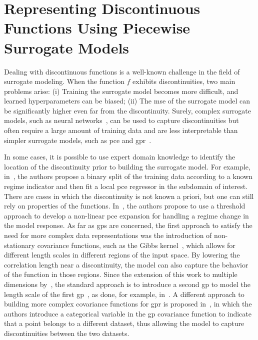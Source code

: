 
\section{Representing Discontinuous Functions Using Piecewise Surrogate Models}
\label{sec:discontinuous_functions}

Dealing with discontinuous functions is a well-known challenge in the field of surrogate modeling. When the function $f$ exhibits discontinuities, two main problems arise: (i) Training the surrogate model becomes more difficult, and learned hyperparameters can be biased; (ii) The \gls{mse} of the surrogate model can be significantly higher even far from the discontinuity. Surely, complex surrogate models, such as neural networks~\cite{ziatdinov2024activelearningfullybayesian}, can be used to capture discontinuities but often require a large amount of training data and are less interpretable than simpler surrogate models, such as \gls{pce} and \gls{gpr}~\cite{Palar2024}.

\smallskip
In some cases, it is possible to use expert domain knowledge to identify the location of the discontinuity prior to building the surrogate model. For example, in~\cite{GoriGallia2024}, the authors propose a binary split of the training data according to a known regime indicator and then fit a local \gls{pce} regressor in the subdomain of interest. There are cases in which the discontinuity is not known a priori, but one can still rely on properties of the functions. In~\cite{Gori2022}, the authors propose to use a threshold approach to develop a non-linear \gls{pce} expansion for handling a regime change in the model response. As far as \glspl{gp} are concerned, the first approach to satisfy the need for more complex data representations was the introduction of non-stationary covariance functions, such as the Gibbs kernel~\cite{gibbs1997}, which allows for different length scales in different regions of the input space. By lowering the correlation length near a discontinuity, the model can also capture the behavior of the function in those regions. Since the extension of this work to multiple dimensions by~\cite{Paciorek2004}, the standard approach is to introduce a second \gls{gp} to model the length scale of the first \gls{gp}~\cite{Hinonen2016}, as done, for example, in~\cite{Chen2023}. A different approach to building more complex covariance functions for \gls{gpr} is proposed in~\cite{Sudret2023, palmatti2020}, in which the authors introduce a categorical variable in the \gls{gp} covariance function to indicate that a point belongs to a different dataset, thus allowing the model to capture discontinuities between the two datasets.

